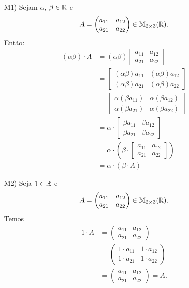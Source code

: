 \documentclass[12pt]{exam}
\begin{document}
\begin{itemize}
        \item[M1)] Sejam $\alpha$, $\beta \in \mathbb{R}$ e
        \[
        A = \begin{pmatrix} a_{11} & a_{12}\\a_{21} & a_{22}\end{pmatrix} \in \mathbb{M}_{2 \times 3}(\mathbb{R}).
        \]
        Então:
        \begin{align*}
            (\alpha\beta)\cdot A & = (\alpha\beta)\begin{bmatrix} a_{11} & a_{12}\\a_{21} & a_{22}\end{bmatrix}
            \\ &= \begin{bmatrix} (\alpha\beta)a_{11} & (\alpha\beta)a_{12}\\(\alpha\beta)a_{21} & (\alpha\beta)a_{22}\end{bmatrix}
            \\ &= \begin{bmatrix} \alpha(\beta a_{11}) & \alpha(\beta a_{12})\\\alpha(\beta a_{21}) & \alpha(\beta a_{22})\end{bmatrix}
            \\ &= \alpha\cdot\begin{bmatrix} \beta a_{11} & \beta a_{12}\\\beta a_{21} & \beta a_{22}\end{bmatrix}
            \\ &= \alpha\cdot\left(\beta\cdot\begin{bmatrix} a_{11} & a_{12}\\a_{21} & a_{22}\end{bmatrix}\right)
            \\ &= \alpha\cdot(\beta\cdot A)
        \end{align*}

        \item[M2)] Seja $1 \in \mathbb{R}$ e
        \[
        A = \begin{pmatrix} a_{11} & a_{12}\\a_{21} & a_{22}\end{pmatrix} \in \mathbb{M}_{2 \times 3}(\mathbb{R}).
        \]
        Temos
        \begin{align*}
            1\cdot A & = \begin{pmatrix} a_{11} & a_{12}\\a_{21} & a_{22}\end{pmatrix}
            \\ &= \begin{pmatrix} 1\cdot a_{11} & 1\cdot a_{12}\\1\cdot a_{21} & 1\cdot a_{22}\end{pmatrix}
            \\ &= \begin{pmatrix} a_{11} & a_{12}\\a_{21} & a_{22}\end{pmatrix} = A.
        \end{align*}


\end{itemize}
\end{document}

